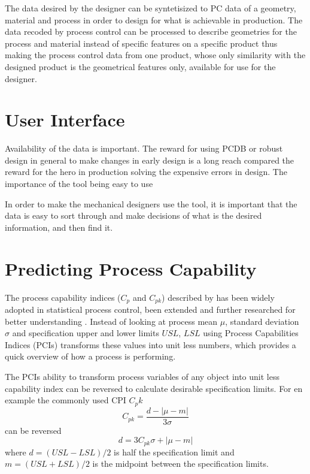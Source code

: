 \documentclass[aip,amsmath, reprint, author-year]{revtex4-1}
\begin{document}
The data desired by the designer can be syntetisized to PC data of a geometry, material and process in order to design for what is achievable in production. 
The data recoded by process control can be processed to describe geometries for the process and material instead of specific features on a specific product thus making the process control data from one product, whose only similarity with the designed product is the geometrical features only, available for use for the designer.

\section{User Interface}
Availability of the data is important. The reward for using PCDB or robust design in general to make changes in early design is a long reach compared the reward for the hero in production solving the expensive errors in design. The importance of the tool being easy to use 

In order to make the mechanical designers use the tool, it is important that the data is easy to sort through and make decisions of what is the desired information, and then find it.

\section{Predicting Process Capability}
The process capability indices ($C_p$ and $C_{pk}$) described by \cite{kane1986process} has been widely adopted in statistical process control, been extended and further researched for better understanding \citep{wu2009overview}. 
Instead of looking at process mean $\mu$, standard deviation $\sigma$ and specification upper and lower limits $USL$, $LSL$ using Process Capabilities Indices (PCIs) transforms these values into unit less numbers, which provides a quick overview of how a process is performing.

The PCIs ability to transform process variables of any object into unit less capability index can be reversed to calculate desirable specification limits. For en example the commonly used CPI $C_pk$ 
\begin{equation}
	C_{pk} = \frac{d - | \mu - m|}{3 \sigma}
\end{equation}
can be reversed
\begin{equation}
	d = 3 C_{pk} \sigma + | \mu - m|
\end{equation}
where $d = (USL - LSL) / 2$ is half the specification limit and $m = (USL + LSL) / 2$ is the midpoint between the specification limits. 
\end{document}
